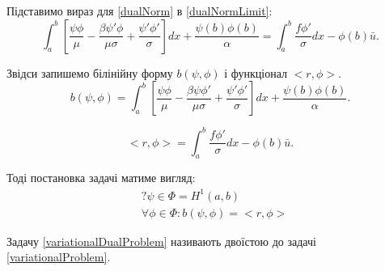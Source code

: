\documentclass[a4paper]{article}
\numberwithin{equation}{section}
\begin{document}
Підставимо вираз для \ref{dualNorm} в \ref{dualNormLimit}:
\begin{equation}
\int_a^b [ \frac{\psi \phi}{\mu} - \frac{\beta \psi' \phi}{\mu \sigma} + \frac{\psi' \phi'}{\sigma} ]dx + \frac{\psi(b) \phi(b)}{\alpha} = \int_a^b \frac{f \phi'}{\sigma}dx - \phi(b) \bar{u}.
\end{equation}

Звідси запишемо білінійну форму $b(\psi, \phi)$ і функціонал $<r,\phi>$.
\begin{equation}
b(\psi, \phi) = \int_a^b [ \frac{\psi \phi}{\mu} - \frac{\beta \psi \phi'}{\mu \sigma} + \frac{\psi' \phi'}{\sigma} ]dx + \frac{\psi(b) \phi(b)}{\alpha}.
\end{equation}

\begin{equation}
<r, \phi> = \int_a^b \frac{f \phi'}{\sigma}dx - \phi(b) \bar{u}.
\end{equation}

Тоді постановка задачі матиме вигляд:
\begin{equation}\label{variationalDualProblem}
\begin{split}
&? \psi \in \Phi = H^1(a,b)
\\& \forall \phi \in \Phi: b(\psi, \phi) = <r, \phi> 
\end{split}
\end{equation}

Задачу \ref{variationalDualProblem} називають двоїстою до задачі \ref{variationalProblem}.
\end{document}

